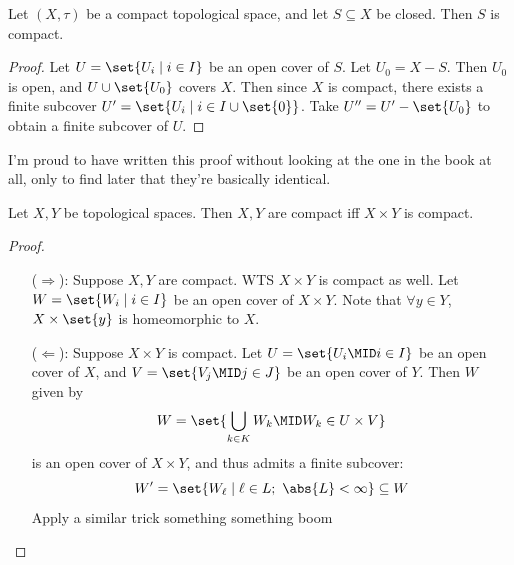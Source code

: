\documentclass{fkbook}
\theoremstyle{snazzydefinition}
\begin{document}
\begin{adjustwidth}{1em}{1em}
  \begin{theorem}
    Let $(X, \tau)$ be a compact topological space, and let $S
    \subseteq X$ be closed. Then $S$ is compact.
  \end{theorem}
  \begin{proof}
    Let $U = \set{U_i \mid i \in I}$ be an open cover of $S$. Let $U_0
    = X - S$. Then $U_0$ is open, and $U \cup \set{U_0}$ covers $X$.
    Then since $X$ is compact, there exists a finite subcover $U' =
    \set{U_i \mid i \in I \cup \set{0}}$. Take $U'' = U' - \set{U_0}$
    to obtain a finite subcover of $U$.
  \end{proof}
  I'm proud to have written this proof without looking at the one in
  the book at all, only to find later that they're basically
  identical.
  \begin{theorem}
    Let $X, Y$ be topological spaces. Then $X, Y$ are compact iff $X
    \times Y$ is compact.
  \end{theorem}
  \begin{proof}~
    \begin{enumerate}
      \item[($\Rightarrow$):] Suppose $X,Y$ are compact. WTS $X \times
        Y$ is compact as well. Let $W = \set{W_i \mid i \in I}$ be an
        open cover of $X \times Y$. Note that $\forall y \in Y$, $X
        \times \set{y}$ is homeomorphic to $X$.
      \item[($\Leftarrow$):] Suppose $X \times Y$ is compact. Let $U =
        \set{U_i \MID i \in I}$ be an open cover of $X$, and $V =
        \set{V_j \MID j \in J}$ be an open cover of $Y$. Then $W$
        given by
        \[
          W = \set{\bigcup_{k \in K} W_k \MID W_k \in U \times V}
        \]
        is an open cover of $X \times Y$, and thus admits a finite
        subcover:
        \[
          W' = \set{W_\ell \mid \ell \in L;\ \abs{L} < \infty}
          \subseteq W
        \]
        Apply a similar trick something something boom
    \end{enumerate}
  \end{proof}

\end{adjustwidth}
\end{document}
